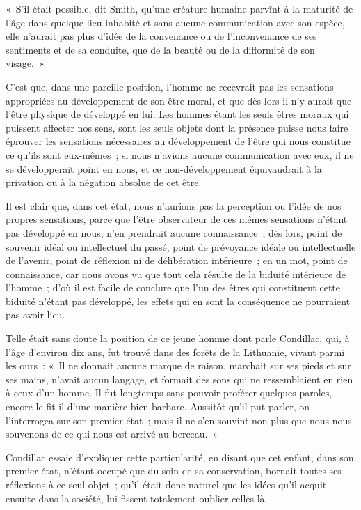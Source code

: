\documentclass[french,twoside]{book} %
\newcommand\chaptercont{} %
\begin{document}
\chaptercont
\noindent « S’il était possible, dit Smith, qu’une créature humaine parvînt à la maturité de l’âge dans quelque lieu inhabité et sans aucune communication avec son espèce, elle n’aurait pas plus d’idée de la convenance ou de l’inconvenance de ses sentiments et de sa conduite, que de la beauté ou de la difformité de son visage. »\par
C’est que, dans une pareille position, l’homme ne recevrait pas les sensations appropriées au développement de son être moral, et que dès lors il n’y aurait que l’être physique de développé en lui. Les hommes étant les seuls êtres moraux qui puissent affecter nos sens, sont les seuls objets dont la présence puisse nous faire éprouver les sensations nécessaires au développement de l’être qui nous constitue ce qu’ils sont eux-mêmes ; si nous n’avions aucune communication avec eux, il ne se développerait point en nous, et ce non-développement équivaudrait à la privation ou à la négation absolue de cet être.\par
Il est clair que, dans cet état, nous n’aurions pas la perception ou l’idée de nos propres sensations, parce que l’être observateur de ces mêmes sensations n’étant pas développé en nous, n’en prendrait aucune connaissance ; dès lors, point de souvenir idéal ou intellectuel du passé, point de prévoyance idéale ou intellectuelle de l’avenir, point de réflexion ni de délibération intérieure ; en un mot, point de connaissance, car nous avons vu que tout cela résulte de la biduité intérieure de l’homme ; d’où il est facile de conclure que l’un des êtres qui constituent cette biduité n’étant pas développé, les effets qui en sont la conséquence ne pourraient pas avoir lieu.\par
Telle était sans doute la position de ce jeune homme dont parle Condillac, qui, à l’âge d’environ dix ans, fut trouvé dans des forêts de la Lithuanie, vivant parmi les ours : « Il ne donnait aucune marque de raison, marchait sur ses pieds et sur ses mains, n’avait aucun langage, et formait des sons qui ne ressemblaient en rien à ceux d’un homme. Il fut longtemps sans pouvoir proférer quelques paroles, encore le fit-il d’une manière bien barbare. Aussitôt qu’il put parler, on l’interrogea sur son premier état ; mais il ne s’en souvint non plus que nous nous souvenons de ce qui nous est arrivé au berceau. »\par
Condillac essaie d’expliquer cette particularité, en disant que cet enfant, dans son premier état, n’étant occupé que du soin de sa conservation, bornait toutes ses réflexions à ce seul objet ; qu’il était donc naturel que les idées qu’il acquit ensuite dans la société, lui fissent totalement oublier celles-là.\par
\end{document}
